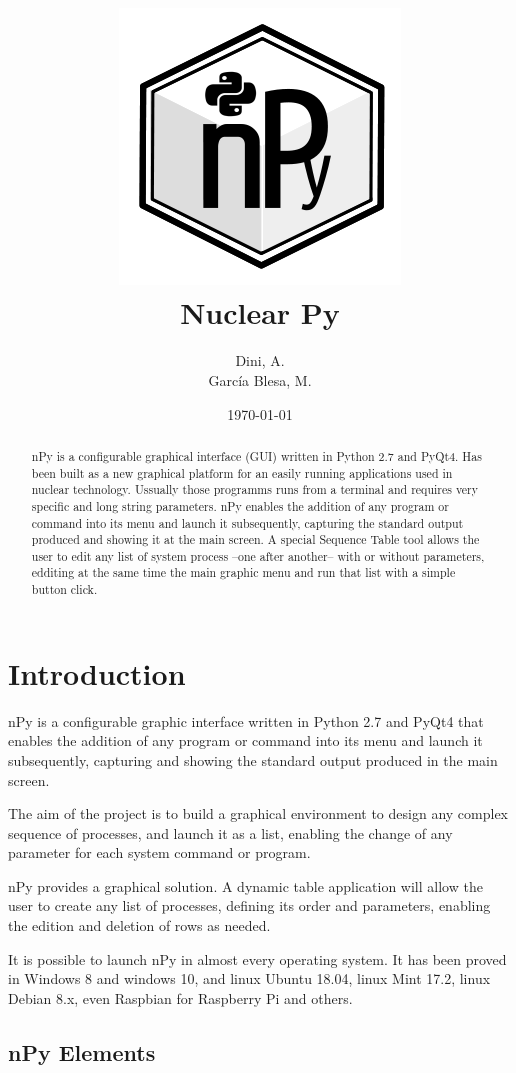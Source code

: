 \documentclass[a4paper,10pt]{article}
\author{Dini, A. \\García Blesa, M.}%
\date{\today}%
\title{\includegraphics[scale=0.5]{img/nPyLogo.png}\\\textbf{Nuclear Py}}%
\begin{document}
\maketitle

\begin{abstract}
nPy is a configurable graphical interface (GUI) written in Python 2.7 and PyQt4. Has been built as a new graphical platform for an easily running applications used in nuclear technology. Ussually those programms runs from a terminal and requires very specific and long string parameters. nPy enables the addition of any program or command into its menu and launch it subsequently, capturing the standard output produced and showing it at the main screen. A special Sequence Table tool allows the user to edit any list of system process --one after another-- with or without parameters, edditing at the same time the main graphic menu and run that list with a simple button click.
\end{abstract}
\newpage

\tableofcontents
\newpage

\section{Introduction}

nPy is a configurable graphic interface written in Python 2.7 and PyQt4 that enables the addition of any program or command into its menu and launch it subsequently, capturing and showing the standard output produced in the main screen.

The aim of the project is to build a graphical environment to design any complex sequence of processes, and launch it as a list, enabling the change of any parameter for each system command or program.

nPy provides a graphical solution. A dynamic table application will allow the user to create any list of processes, defining its order and parameters, enabling the edition and deletion of rows as needed.

It is possible to launch nPy in almost every operating system. It has been proved in Windows 8 and windows 10, and linux Ubuntu 18.04, linux Mint 17.2, linux Debian 8.x, even Raspbian for Raspberry Pi and others.

\subsection{nPy Elements}
\end{document}

